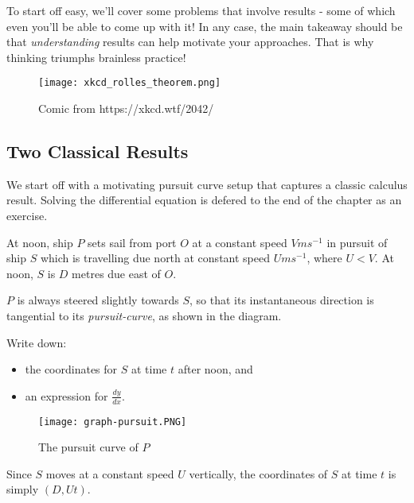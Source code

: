 \documentclass[../main.tex]{subfiles}
\begin{document}
To start off easy, we'll cover some problems that involve results - some of which even you'll be able to come up with it! In any case, the main takeaway should be that \textit{understanding} results can help motivate your approaches. That is why thinking triumphs brainless practice!

\begin{figure}[H]
    \centering
    \texttt{[image: xkcd\_rolles\_theorem.png]}
    \caption{Comic from https://xkcd.wtf/2042/}
\end{figure}

\subsection{Two Classical Results}
We start off with a motivating pursuit curve setup that captures a classic calculus result. Solving the differential equation is defered to the end of the chapter as an exercise.
\begin{example}
At noon, ship $P$ sets sail from port $O$ at a constant speed $V ms^{-1}$ in pursuit of ship $S$ which is travelling due north at constant speed $U ms^{-1}$, where $U < V$. At noon, $S$ is $D$ metres due east of $O$.

$P$ is always steered slightly towards $S$, so that its instantaneous direction is tangential to its \textit{pursuit-curve}, as shown in the diagram.

Write down:
\begin{itemize}
    \item the coordinates for $S$ at time $t$ after noon, and
    \item an expression for $\frac{dy}{dx}$.
\end{itemize}
\end{example}
\begin{figure}[H]
    \centering
    \texttt{[image: graph-pursuit.PNG]}
    \caption{The pursuit curve of $P$}
    \label{fig:graph-pursuit}
\end{figure}
Since $S$ moves at a constant speed $U$ vertically, the coordinates of $S$ at time $t$ is simply $(D, Ut)$. 
\end{document}
